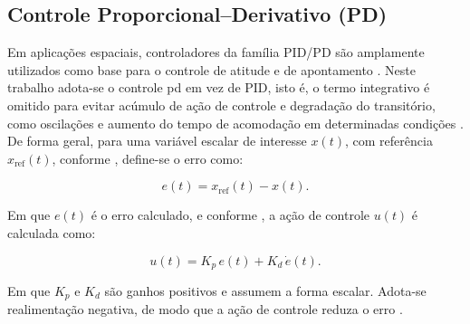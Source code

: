 
\subsection{Controle Proporcional--Derivativo (PD)}
\label{sec:controle_PD}

Em aplicações espaciais, controladores da família PID/PD são amplamente utilizados como base para o controle de atitude e de apontamento \cite{xie2016applications}.
Neste trabalho adota-se o controle \gls{pd} em vez de PID, isto é, o termo integrativo é omitido para evitar acúmulo de ação de controle e degradação do transitório, como oscilações e aumento do tempo de acomodação em determinadas condições \cite{razak2007industrial}.
De forma geral, para uma variável escalar de interesse $x(t)$, com referência $x_{\text{ref}}(t)$, conforme \cite{astrom1995pid}, define-se o erro como:

\begin{equation}
e(t) = x_{\text{ref}}(t) - x(t).
\end{equation}

Em que $e(t)$ é o erro calculado, e conforme \cite{xue2007linear}, a ação de controle $u(t)$ é calculada como:

\begin{equation}
u(t) = K_p\,e(t) + K_d\,\dot e(t).
\label{eq:controle_PD_geral}
\end{equation}

Em que $K_p$ e $K_d$ são ganhos positivos e assumem a forma escalar.
Adota-se realimentação negativa, de modo que a ação de controle reduza o erro \cite{ogata2010engenharia}.






